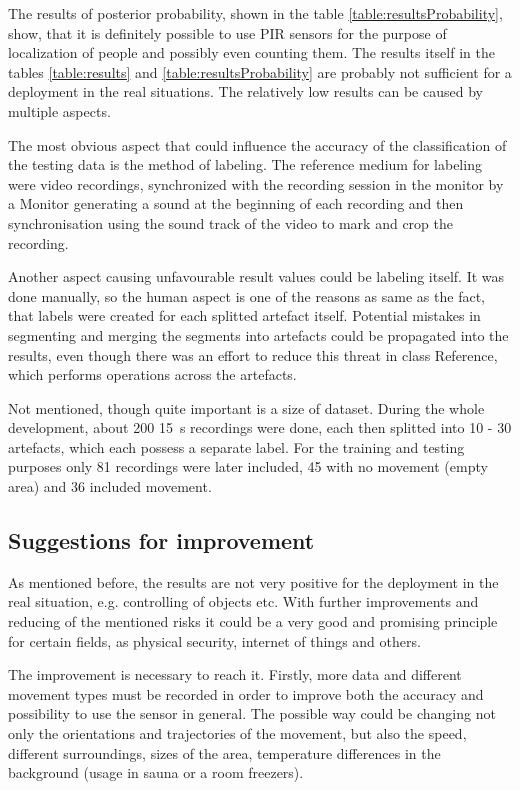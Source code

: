 The results of posterior probability, shown in the table \ref{table:resultsProbability}, show,
that it is definitely possible to use PIR sensors for the purpose of localization of people
and possibly even counting them. The results itself in the tables \ref{table:results} and
\ref{table:resultsProbability} are probably not sufficient for a deployment in the real situations.
The relatively low results can be caused by multiple aspects.

The most obvious aspect that could influence the accuracy of the classification of the testing data
is the method of labeling. The reference medium for labeling were video recordings, synchronized
with the recording session in the monitor by a Monitor generating a sound at the beginning of each
recording and then synchronisation using the sound track of the video to mark and crop the recording.

Another aspect causing unfavourable result values could be labeling itself. It was done manually,
so the human aspect is one of the reasons as same as the fact, that labels were created for each
splitted artefact itself. Potential mistakes in segmenting and merging the segments into artefacts
could be propagated into the results, even though there was an effort to reduce this threat in
class Reference, which performs operations across the artefacts.

Not mentioned, though quite important is a size of dataset. During the whole development, about 200
15~s recordings were done, each then splitted into 10 - 30 artefacts, which each possess a separate
label. For the training and testing purposes only 81 recordings were later included, 45 with no
movement (empty area) and 36 included movement.


\subsection*{Suggestions for improvement}
As mentioned before, the results are not very positive for the deployment in the real situation, e.g.
controlling of objects etc. With further improvements and reducing of the mentioned risks it could
be a very good and promising principle for certain fields, as physical security, internet of things
and others.

The improvement is necessary to reach it. Firstly, more data and different movement types must be
recorded in order to improve both the accuracy and possibility to use the sensor in general. 
The possible way could be changing not only the orientations and trajectories of the movement,
but also the speed, different surroundings, sizes of the area, temperature differences in the
background (usage in sauna or a room freezers).

